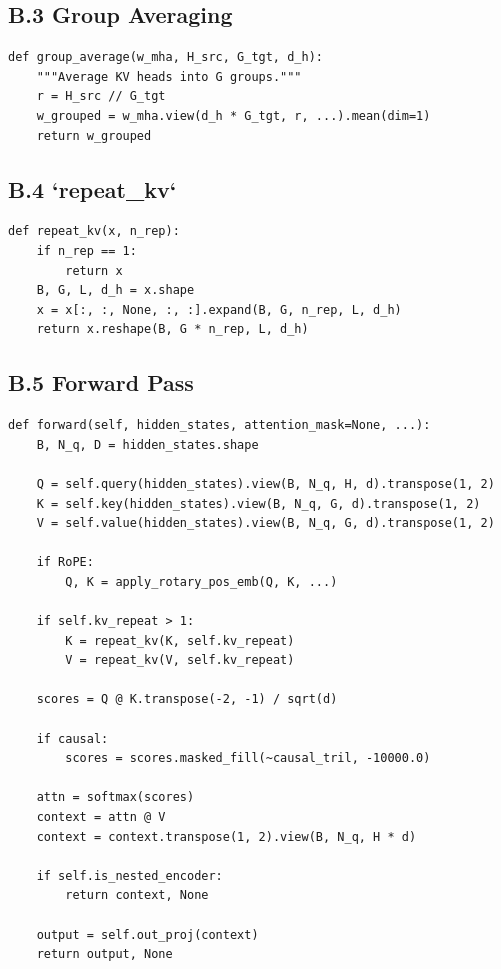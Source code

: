 \subsection{B.3 Group Averaging}

\begin{lstlisting}
def group_average(w_mha, H_src, G_tgt, d_h):
    """Average KV heads into G groups."""
    r = H_src // G_tgt
    w_grouped = w_mha.view(d_h * G_tgt, r, ...).mean(dim=1)
    return w_grouped
\end{lstlisting}

\subsection{B.4 `repeat\_kv`}

\begin{lstlisting}
def repeat_kv(x, n_rep):
    if n_rep == 1:
        return x
    B, G, L, d_h = x.shape
    x = x[:, :, None, :, :].expand(B, G, n_rep, L, d_h)
    return x.reshape(B, G * n_rep, L, d_h)
\end{lstlisting}

\subsection{B.5 Forward Pass}

\begin{lstlisting}
def forward(self, hidden_states, attention_mask=None, ...):
    B, N_q, D = hidden_states.shape
    
    Q = self.query(hidden_states).view(B, N_q, H, d).transpose(1, 2)
    K = self.key(hidden_states).view(B, N_q, G, d).transpose(1, 2)
    V = self.value(hidden_states).view(B, N_q, G, d).transpose(1, 2)
    
    if RoPE:
        Q, K = apply_rotary_pos_emb(Q, K, ...)
    
    if self.kv_repeat > 1:
        K = repeat_kv(K, self.kv_repeat)
        V = repeat_kv(V, self.kv_repeat)
    
    scores = Q @ K.transpose(-2, -1) / sqrt(d)
    
    if causal:
        scores = scores.masked_fill(~causal_tril, -10000.0)
    
    attn = softmax(scores)
    context = attn @ V
    context = context.transpose(1, 2).view(B, N_q, H * d)
    
    if self.is_nested_encoder:
        return context, None
    
    output = self.out_proj(context)
    return output, None
\end{lstlisting}


